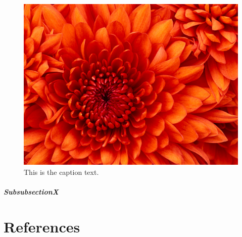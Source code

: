 \documentclass[12pt, twoside]{article}
\begin{document}
\begin{figure}[h] 
	\centering 	\includegraphics[width=0.5\linewidth]{Chrysanthemum.jpg}
	\caption{This is the caption text.}
	\label{fig:Chrysanthemum}
\end{figure}
\subsubsection{SubsubsectionX}\label{ssec:subsubsectionX2}
\blindtext[2]


\part{References}





\end{document}
